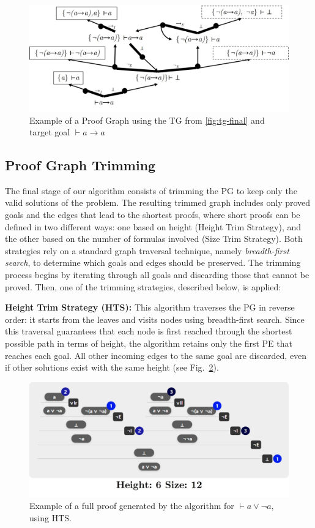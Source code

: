 \begin{figure}[t]
    \centering
    \includegraphics[width=0.8\linewidth]{resources/sg-gen.jpg}
    \caption{Example of a Proof Graph using the TG from \autoref{fig:tg-final} and target goal \(\vdash a \to a\)}
    \label{fig:st-ex}
\end{figure}

\subsection{Proof Graph Trimming}

The final stage of our algorithm consists of trimming the PG to keep only the valid solutions of the problem. The resulting trimmed graph includes only proved goals and the edges that lead to the shortest proofs, where short proofs can be defined in two different ways: one based on height (Height Trim Strategy), and the other based on the number of formulas involved (Size Trim Strategy). Both strategies rely on a standard graph traversal technique, namely \emph{breadth-first search}, to determine which goals and edges should be preserved. The trimming process begins by iterating through all goals and discarding those that cannot be proved. Then, one of the trimming strategies, described below, is applied:
\vspace{1em}

\textbf{Height Trim Strategy (HTS):} This algorithm traverses the PG in reverse order: it starts from the leaves and visits nodes using breadth-first search. Since this traversal guarantees that each node is first reached through the shortest possible path in terms of height, the algorithm retains only the first PE that reaches each goal. All other incoming edges to the same goal are discarded, even if other solutions exist with the same height (see Fig.~\ref{fig:sg-trim-height}).

\begin{figure}[t]
    \centering
    \includegraphics[width=0.6\linewidth]{resources/trim-height.jpg}
    \caption{Example of a full proof generated by the algorithm for \(\vdash a \vee \lnot a\), using HTS.}
    \label{fig:sg-trim-height}
\end{figure}

